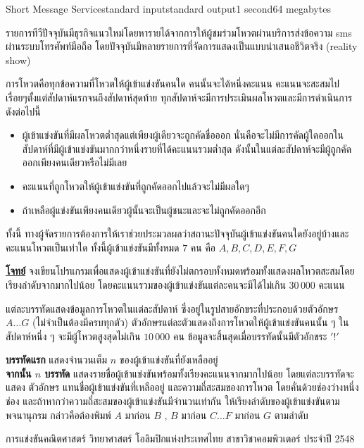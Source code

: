 \documentclass[11pt,a4paper]{article}
\begin{document}
\begin{problem}{Short Message Service}{standard input}{standard output}{1 second}{64 megabytes}

รายการทีวีปัจจุบันมีธุรกิจแนวใหม่โดยหารายได้จากการให้ผู้ชมร่วมโหวตผ่านบริการส่งข้อความ sms ผ่านระบบโทรศัพท์มือถือ โดยปัจจุบันมีหลายรายการที่จัดการแสดงเป็นแบบนำเสนอชีวิตจริง (reality show)

การโหวตคือทุกข้อความที่โหวตให้ผู้เข้าแข่งขันคนใด คนนั้นจะได้หนึ่งคะแนน คะแนนจะสะสมไปเรื่อยๆตั้งแต่สัปดาห์แรกจนถึงสัปดาห์สุดท้าย ทุกสัปดาห์จะมีการประเมินผลโหวตและมีการดำเนินการดังต่อไปนี้

\begin{itemize}
  \item ผู้เข้าแข่งขันที่มีผลโหวตต่ำสุดแต่เพียงผู้เดียวจะถูกคัดชื่อออก นั่นคือจะไม่มีการคัดผู้ใดออกในสัปดาห์ที่มีผู้เข้าแข่งขันมากกว่าหนึ่งรายที่ได้คะแนนรวมต่ำสุด ดังนั้นในแต่ละสัปดาห์จะมีผู้ถูกคัดออกเพียงคนเดียวหรือไม่มีเลย
  \item คะแนนที่ถูกโหวตให้ผู้เข้าแข่งขันที่ถูกคัดออกไปแล้วจะไม่มีผลใดๆ
  \item ถ้าเหลือผู้แข่งขันเพียงคนเดียวผู้นั้นจะเป็นผู้ชนะและจะไม่ถูกคัดออกอีก
\end{itemize}

ทั้งนี้ ทางผู้จัดรายการต้องการให้เราช่วยประมวลผลว่าสถานะปัจจุบันผู้เข้าแข่งขันคนใดยังอยู่บ้างและคะแนนโหวตเป็นเท่าใด ทั้งนี้ผู้เข้าแข่งขันมีทั้งหมด $7$ คน คือ $A, B, C, D, E, F, G$

\underline{\textbf{โจทย์}} จงเขียนโปรแกรมเพื่อแสดงผู้เข้าแข่งขันที่ยังไม่ตกรอบทั้งหมดพร้อมทั้งแสดงผลโหวตสะสมโดยเรียงลำดับจากมากไปน้อย โดยคะแนนรวมของผู้เข้าแข่งขันแต่ละคนจะมีได้ไม่เกิน $30\,000$ คะแนน

\InputFile

แต่ละบรรทัดแสดงข้อมูลการโหวตในแต่ละสัปดาห์ ซึ่งอยู่ในรูปสายอักขระที่ประกอบด้วยตัวอักษร $A…G$ (ไม่จำเป็นต้องมีครบทุกตัว) ตัวอักษรแต่ละตัวแสดงถึงการโหวตให้ผู้เข้าแข่งขันคนนั้น ๆ ในสัปดาห์หนึ่ง ๆ จะมีผู้โหวตสูงสุดไม่เกิน $10\,000$ คน ข้อมูลจะสิ้นสุดเมื่อบรรทัดนั้นมีตัวอักขระ $'!'$

\OutputFile

\textbf{บรรทัดแรก} แสดงจำนวนเต็ม $n$ ของผู้เข้าแข่งขันที่ยังเหลืออยู่ \\ \textbf{จากนั้น $n$ บรรทัด} แสดงรายชื่อผู้เข้าแข่งขันพร้อมทั้งเรียงคะแนนจากมากไปน้อย โดยแต่ละบรรทัดจะแสดง ตัวอักษร แทนชื่อผู้เข้าแข่งขันที่เหลืออยู่ และความถี่สะสมของการโหวต โดยคั่นด้วยช่องว่างหนึ่งช่อง และถ้าหากว่าความถี่สะสมของผู้เข้าแข่งขันมีจำนวนเท่ากัน ให้เรียงลำดับของผู้เข้าแข่งขันตามพจนานุกรม กล่าวคือต้องพิมพ์ $A$ มาก่อน $B$ , $B$ มาก่อน $C \dotsc F$ มาก่อน $G$ ตามลำดับ

\Examples

\begin{example}
%
\end{example}

\Source

การแข่งขันคณิตศาสตร์ วิทยาศาสตร์ โอลิมปิกแห่งประเทศไทย สาขาวิชาคอมพิวเตอร์ ประจำปี 2548

\end{problem}
\end{document}
